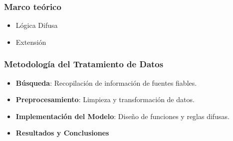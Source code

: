 \documentclass{beamer}
\newcommand{\slideauthor}[1]{\gdef\insertslideauthor{#1}}
\begin{document}
\begin{frame}
\frametitle{Marco teórico}
\slideauthor{Diego Fogued}
\begin{itemize}
    \item Lógica Difusa
    \item Extensión
\end{itemize}

\end{frame}
\begin{frame}
\frametitle{Metodología del Tratamiento de Datos}
\slideauthor{Diego Fogued}
\begin{itemize}
    \item \textbf{Búsqueda}: Recopilación de información de fuentes fiables.
    \vspace{0.35cm} 
    \item \textbf{Preprocesamiento}: Limpieza y transformación de datos.
    \vspace{0.35cm} 
    \item \textbf{Implementación del Modelo}: Diseño de funciones y reglas difusas.
    \vspace{0.35cm} 
    \item \textbf{Resultados y Conclusiones}
\end{itemize}
\end{frame}
\end{document}
